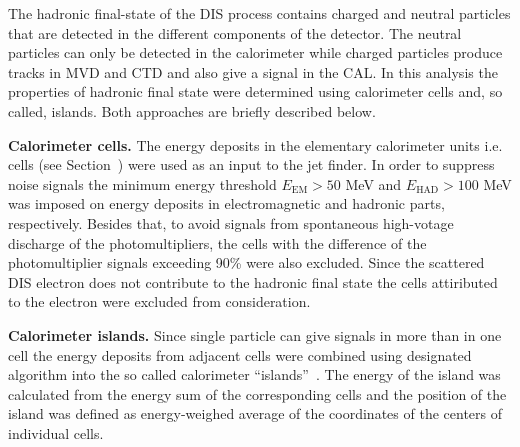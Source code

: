 The hadronic final-state of the DIS process contains charged and neutral particles that are detected in the different components of the \zeus detector. The neutral particles can only be detected in the calorimeter while charged particles produce tracks in MVD and CTD and also give a signal in the CAL. In this analysis the properties of hadronic final state were determined using calorimeter cells and, so called, islands. Both approaches are briefly described below.

\textbf{Calorimeter cells.}
The energy deposits in the elementary calorimeter units i.e. cells (see Section~\cite{subsec:UCAL}) were used as an input to the jet finder. In order to suppress noise signals the minimum energy threshold $E_\text{EM}>50$ MeV and $E_\text{HAD}>100$ MeV was imposed on energy deposits in electromagnetic and hadronic parts, respectively. Besides that, to avoid signals from spontaneous high-votage discharge of the photomultipliers, the cells with the difference of the photomultiplier signals exceeding 90\% were also excluded. Since the scattered DIS electron does not contribute to the hadronic final state the cells attiributed to the electron were excluded from consideration. 

\textbf{Calorimeter islands.}
Since single particle can give signals in more than in one cell the energy deposits from adjacent cells were combined using designated algorithm into the so called calorimeter ``islands''~\cite{upub:grosse-knetter:zn9739}. The energy of the island was calculated from the energy sum of the corresponding cells and the position of the island was defined as energy-weighed average of the coordinates of the centers of individual cells. 